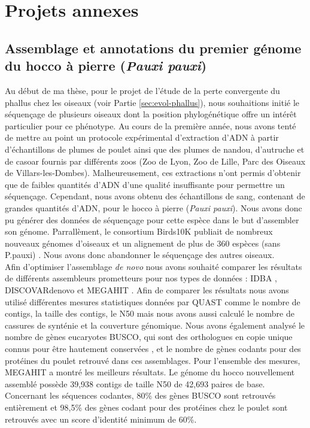 \chapter{Projets annexes}
{\hypersetup{linkcolor=GREYDARK}\minitoc}
\label{chap:projets-annexes}

\section{Assemblage et annotations du premier génome du hocco à pierre (\textit{Pauxi pauxi})}
\label{annexe:hocco}

Au début de ma thèse, pour le projet de l'étude de la perte convergente du phallus chez les oiseaux (voir Partie \ref{sec:evol-phallus}), nous souhaitions initié le séquençage de plusieurs oiseaux dont la position phylogénétique offre un intérêt particulier pour ce phénotype. Au cours de la première année, nous avons tenté de mettre au point un protocole expérimental d’extraction d’ADN à partir d’échantillons de plumes de poulet ainsi que des plumes de nandou, d’autruche et de casoar fournis par différents zoos (Zoo de Lyon, Zoo de Lille, Parc des Oiseaux de Villars-les-Dombes). Malheureusement, ces extractions n’ont permis d’obtenir que de faibles quantités d’ADN d’une qualité insuffisante pour permettre un séquençage. Cependant, nous avons obtenu des échantillons de sang, contenant de grandes quantités d’ADN, pour le hocco à pierre (\textit{Pauxi pauxi}). Nous avons donc pu générer des données de séquençage pour cette espèce dans le but d'assembler son génome. Parrallèment, le consortium Birds10K publiait de nombreux nouveaux génomes d'oiseaux et un alignement de plus de 360 espèces (sans P.pauxi) \citep{feng_dense_2020}. Nous avons donc abandonner le séquençage des autres oiseaux.\\

Afin d’optimiser l’assemblage \textit{de novo} nous avons souhaité comparer les résultats de différents assembleurs prometteurs pour nos types de données : IDBA \citep{peng_idba_2010},  DISCOVARdenovo \citep{weisenfeld_comprehensive_2014} et MEGAHIT \citep{li_megahit_2015}. Afin de comparer les résultats nous avons utilisé différentes mesures statistiques données par QUAST \citep{gurevich_quast_2013} comme le nombre de contigs, la taille des contigs, le N50 mais nous avons aussi calculé le nombre de cassures de synténie et la couverture génomique. Nous avons également analysé le nombre de gènes eucaryotes BUSCO, qui sont des orthologues en copie unique connus pour être hautement conservées \citep{simao_busco_2015}, et le nombre de gènes codants pour des protéines du poulet retrouvé dans ces assemblages. Pour l’ensemble des mesures, MEGAHIT a montré les meilleurs résultats. Le génome du hocco nouvellement assemblé possède 39,938 contigs de taille N50 de 42,693 paires de base. Concernant les séquences codantes, 80\% des gènes BUSCO sont retrouvés entièrement et 98,5\% des gènes codant pour des protéines chez le poulet sont retrouvés avec un score d’identité minimum de 60\%. \\

